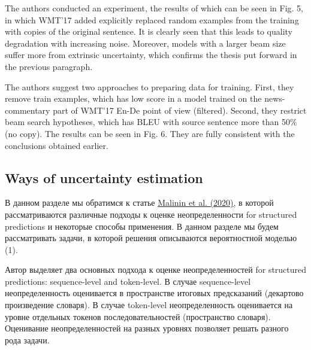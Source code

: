 \documentclass[a4paper,14pt]{extarticle}
\newcommand{\bibref}[3]{\hyperlink{#1}{#2 (#3)}}
\begin{document}
	\begin{figure}[t]
	\end{figure}
	
	The authors conducted an experiment, the results of which can be seen in Fig. 5, in which WMT'17 added explicitly replaced random examples from the training with copies of the original sentence. It is clearly seen that this leads to quality degradation with increasing noise. Moreover, models with a larger beam size suffer more from extrinsic uncertainty, which confirms the thesis put forward in the previous paragraph.
	
	The authors suggest two approaches to preparing data for training. First, they remove train examples, which has low score in a model trained on the news-commentary part of WMT'17 En-De point of view (filtered). Second, they restrict beam search hypotheses, which has BLEU with source sentence more than 50\% (no copy). The results can be seen in Fig. 6. They are fully consistent with the conclusions obtained earlier.
	\subsection{Ways of uncertainty estimation}
	В данном разделе мы обратимся к статье \bibref{uncertainty}{Malinin et al.}{2020}, в которой рассматриваются различные подходы к оценке неопределенности for structured predictions и некоторые способы применения. В данном разделе мы будем рассматривать задачи, в которой решения описываются вероятностной моделью  (1).
	
	Автор выделяет два основных подхода к оценке неопределенностей for structured predictions: sequence-level and token-level. В случае sequence-level неопределенность оценивается в пространстве итоговых предсказаний (декартово произведение словаря). В случае token-level неопределенность оценивается на уровне отдельных токенов последовательностей (пространство словаря). Оценивание неопределенностей на разных уровнях позволяет решать разного рода задачи.
	
\end{document}

